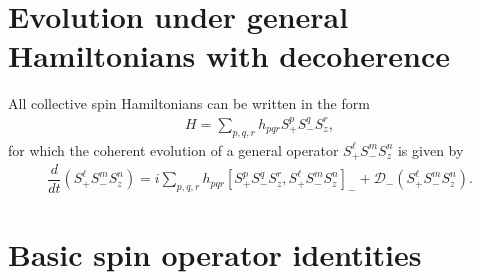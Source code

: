 \documentclass[aps,notitlepage,nofootinbib,11pt]{revtex4-1}
\newcommand{\f}[2]{\dfrac{#1}{#2}} %
\newcommand{\p}[1]{\left(#1\right)} %
\renewcommand{\sp}[1]{\left[#1\right]} %
\newcommand{\D}{\mathcal{D}}
\newcommand{\1}{\mathds{1}}
\begin{document}
\section{Evolution under general Hamiltonians with decoherence}

All collective spin Hamiltonians can be written in the form
\begin{align}
  H = \sum_{p,q,r} h_{pqr} S_+^p S_-^q S_z^r,
\end{align}
for which the coherent evolution of a general operator
$S_+^\ell S_-^m S_z^n$ is given by
\begin{align}
  \f{d}{dt} \p{S_+^\ell S_-^m S_z^n}
  = i\sum_{p,q,r} h_{pqr} \sp{S_+^p S_-^q S_z^r, S_+^\ell S_-^m S_z^n}_-
  + \D_-\p{S_+^\ell S_-^m S_z^n}.
\end{align}




\newpage
\appendix

\section{Basic spin operator identities}
\label{sec:identities}
\end{document}
